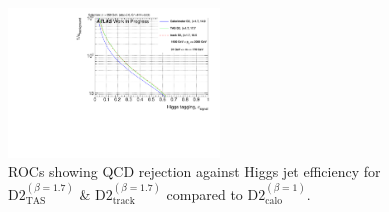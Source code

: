 \begin{figure}[H]
\bigskip
\includegraphics[width=0.5\textwidth]{sascha_input/Appendix/Higgs_best/ROC_ALL_h_recoJet_D2_17_bin5.pdf} 
\caption{\footnotesize{ROCs showing QCD rejection against Higgs jet efficiency for $\text{D2}_{\text{TAS}}^{(\beta=1.7)}$ \& $\text{D2}_{\text{track}}^{(\beta=1.7)}$ compared to $\text{D2}_{\text{calo}}^{(\beta=1)}$.}}
\end{figure}\label{fig:ROC_best_higgs}

